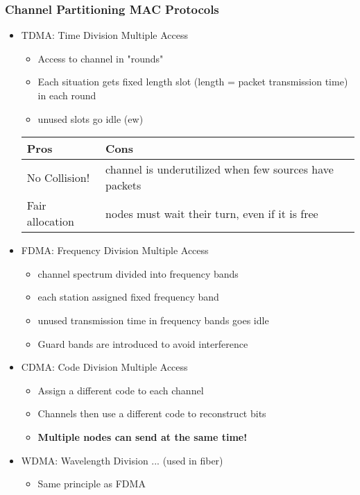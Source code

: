 \documentclass{article}
\begin{document}
\subsubsection*{Channel Partitioning MAC Protocols}

\begin{itemize}
	\item TDMA: Time Division Multiple Access
	\begin{itemize}
		\item Access to channel in "rounds"
		\item Each situation gets fixed length slot (length = packet transmission time) in each round
		\item unused slots go idle (ew)
	\end{itemize}
	\begin{tabular}{l|l}
	Pros & Cons \\ \hline
	No Collision! & channel is underutilized when few sources have packets \\
	Fair allocation & nodes must wait their turn, even if it is free
	\end{tabular}
	
	\item FDMA: Frequency Division Multiple Access
	\begin{itemize}
		\item channel spectrum divided into frequency bands
		\item each station assigned fixed frequency band
		\item unused transmission time in frequency bands goes idle
		\item Guard bands are introduced to avoid interference
	\end{itemize}
	
	\item CDMA: Code Division Multiple Access
	\begin{itemize}
		\item Assign a different code to each channel
		\item Channels then use a different code to reconstruct bits
		\item \textbf{Multiple nodes can send at the same time!}
	\end{itemize}
	
	\item WDMA: Wavelength Division ... (used in fiber)
	\begin{itemize}
		\item Same principle as FDMA
	\end{itemize}
	

\end{itemize}
\end{document}
